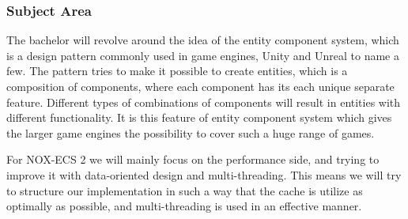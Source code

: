 \subsubsection{Subject Area}
The bachelor will revolve around the idea of the entity component system, which is a design pattern commonly used in game engines, Unity and Unreal to name a few. The pattern tries to make it possible to create entities, which is a composition of components, where each component has its each unique separate feature. Different types of combinations of components will result in entities with different functionality. It is this feature of entity component system which gives the larger game engines the possibility to cover such a huge range of games.
\par For NOX-ECS 2 we will mainly focus on the performance side, and trying to improve it with data-oriented design and multi-threading. This means we will try to structure our implementation in such a way that the cache is utilize as optimally as possible, and multi-threading is used in an effective manner.